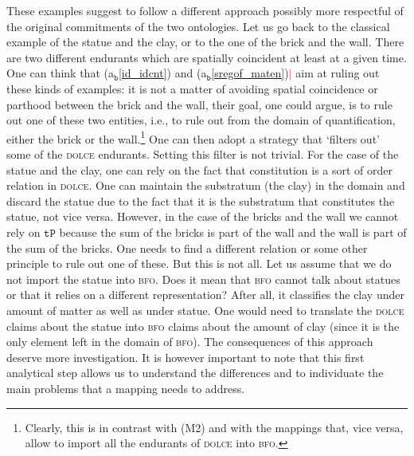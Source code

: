 \documentclass[ao]{iosart2x}
\newcommand{\nb}[1]{\textcolor{red}{$|$}\marginpar{\hspace*{-0cm}\parbox{20mm}{\scriptsize\raggedright\textcolor{red}{#1}}}}
\newcommand{\bfoAxLabel}{\textrm{a$_\texttt{b}$}}
\newcommand{\refbfoax}[1]{({\bfoAxLabel}\ref{#1})}
\newcommand{\pr}[1]{\mathtt{#1}}
\newcommand{\dolce}{{\textsc{dolce}}}
\newcommand{\bfo}{{\textsc{bfo}}}
\newcommand {\TPd} {\ensuremath{\pr{tP}}}
\begin{document}
\medskip
These examples suggest to follow a different approach possibly more respectful of the original commitments of the two ontologies. Let us go back to the classical example of the statue and the clay, or to the one of the brick and the wall. There are two different endurants which are spatially coincident at least at a given time. One can think that \refbfoax{id_idcnt} and \refbfoax{sregof_maten}\nb{CM: forse si può fare riferimento agli ai teoremi o vice versa si possono introdurre gli assiomi e semplicemente dire che questi non valgono in dolce+def} aim at ruling out these kinds of examples: it is not a matter of avoiding spatial coincidence or parthood between the brick and the wall, their goal, one could argue, is to rule out one of these two entities, i.e., to rule out from the domain  of quantification, either the brick or the wall.\footnote{Clearly, this is in contrast with (M2) and with the mappings that, vice versa, allow to import all the endurants of {\dolce} into {\bfo}.} One can then adopt a strategy that `filters out' some of the {\dolce} endurants. Setting this filter is not trivial. For the case of the statue and the clay, one can rely on the fact that constitution is a sort of order relation in {\dolce}. One can maintain the substratum (the clay) in the domain and discard the statue due to the fact that it is the substratum that constitutes the statue, not vice versa. However, in the case of the bricks and the wall we cannot rely on $\TPd$ because the sum of the bricks is part of the wall and the wall is part of the sum of the bricks. One needs to find a different relation or some other principle to rule out one of these. But this is not all. Let us assume that we do not import the statue into {\bfo}. Does it mean that {\bfo} cannot talk about statues or that it relies on a different representation? After all, it classifies the clay under amount of matter as well as under statue. One would need to translate the {\dolce} claims about the statue into {\bfo} claims about the amount of clay %
(since it is the only element left in the domain of {\bfo}). The consequences of this approach deserve more investigation. It is however important to note that this first analytical step allows us to understand the differences and to individuate the main problems that a mapping needs to address.
\end{document}
